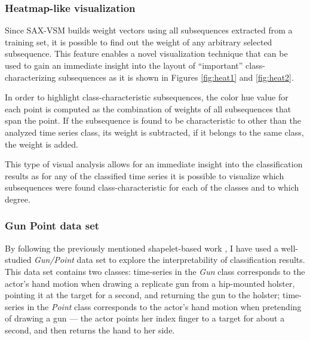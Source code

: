 \subsubsection{Heatmap-like visualization}
Since SAX-VSM builds \tfidf weight vectors using all subsequences extracted from a
training set, it is possible to find out the weight of any arbitrary selected subsequence.
This feature enables a novel visualization technique that can be used to gain an immediate
insight into the layout of ``important'' class-characterizing subsequences as it is shown in Figures
\ref{fig:heat1} and \ref{fig:heat2}.

In order to highlight class-characteristic subsequences, the color hue value for each point is computed as the combination of 
\tfidf weights of all subsequences that span the point. If the subsequence is found to be characteristic to other than the 
analyzed time series class, its weight is subtracted, if it belongs to the same class, the weight is added. 

This type of visual analysis allows for an immediate insight into the classification results as for any of the classified 
time series it is possible to visualize which subsequences were found class-characteristic for each of the classes and to 
which degree.

\subsubsection{Gun Point data set}
By following the previously mentioned shapelet-based work \cite{citeulike:7344347} \cite{citeulike:11345338}, 
I have used a well-studied \textit{\mbox{Gun/Point}} data set \cite{Ratanamahatana04makingtime-series} to explore the 
interpretability of classification results. This data set contains two classes: 
time-series in the \textit{Gun} class corresponds to the actor's hand motion when drawing
a replicate gun from a hip-mounted holster, pointing it at the target for a second, and returning the gun to the holster; 
time-series in the \textit{Point} class corresponds to the actor's hand motion when pretending
of drawing a gun --- the actor points her index finger to a target for about a second, and then returns the 
hand to her side. 

